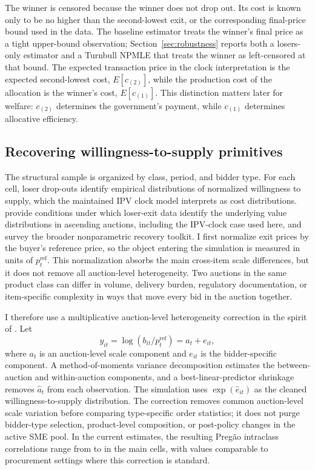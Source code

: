 The winner is censored because the winner does not drop out. Its cost is
known only to be no higher than the second-lowest exit, or the corresponding
final-price bound used in the data. The baseline estimator treats the
winner's final price as a tight upper-bound observation;
Section~\ref{sec:robustness} reports both a losers-only estimator and a
Turnbull NPMLE that treats the winner as left-censored at that bound. The
expected transaction price in the clock interpretation is the expected
second-lowest cost, $E[c_{(2)}]$, while the production cost of the
allocation is the winner's cost, $E[c_{(1)}]$. This distinction matters
later for welfare: $c_{(2)}$ determines the government's payment, while
$c_{(1)}$ determines allocative efficiency.

\subsection{Recovering willingness-to-supply primitives}

The structural sample is organized by class, period, and bidder type. For
each cell, loser drop-outs identify empirical distributions of normalized
willingness to supply, which the maintained IPV clock model interprets as
cost distributions. \citet{atheyhaile2002} provide conditions under which
loser-exit data identify the underlying value distributions in ascending
auctions, including the IPV-clock case used here, and
\citet{atheyhaile2007} survey the broader nonparametric recovery toolkit. I first normalize exit prices by the buyer's reference
price, so the object entering the simulation is measured in units of
$p_t^{\mathrm{ref}}$. This normalization absorbs the main cross-item scale
differences, but it does not remove all auction-level heterogeneity. Two
auctions in the same product class can differ in volume, delivery burden,
regulatory documentation, or item-specific complexity in ways that move
every bid in the auction together.

I therefore use a multiplicative auction-level heterogeneity correction in
the spirit of \citet{krasnokutskaya2011}. Let
\[
    y_{it} = \log(b_{it}/p_t^{\mathrm{ref}}) = a_t + e_{it},
\]
where $a_t$ is an auction-level scale component and $e_{it}$ is the
bidder-specific component. A method-of-moments variance decomposition
estimates the between-auction and within-auction components, and a
best-linear-predictor shrinkage removes $\hat a_t$ from each observation.
The simulation uses $\exp(\hat e_{it})$ as the cleaned willingness-to-supply
distribution. The correction removes common auction-level scale variation before comparing
type-specific order statistics; it does not purge bidder-type selection,
product-level composition, or post-policy changes in the active SME pool.
In the current estimates, the resulting Preg\~ao intraclass correlations
range from \iccNpSme{} to \iccPharmaNonSme{} in the main cells, with values
comparable to procurement settings where this correction is standard.

